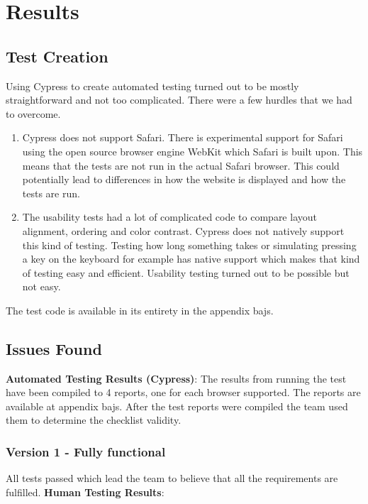 \documentclass[journal,twocolumn]{IEEEtran}
\begin{document}
\section{Results}
\subsection{Test Creation}
Using Cypress to create automated testing turned out to be mostly straightforward and not too complicated. There were a few hurdles that we had to overcome.

\begin{enumerate}
    \item Cypress does not support Safari. There is experimental support for Safari using the open source browser engine WebKit which Safari is built upon. This means that the tests are not run in the actual Safari browser. This could potentially lead to differences in how the website is displayed and how the tests are run.
    \item The usability tests had a lot of complicated code to compare layout alignment, ordering and color contrast. Cypress does not natively support this kind of testing. Testing how long something takes or simulating pressing a key on the keyboard for example has native support which makes that kind of testing easy and efficient. Usability testing turned out to be possible but not easy.
\end{enumerate}

The test code is available in its entirety in the appendix bajs. %

\subsection{Issues Found}
\textbf{Automated Testing Results (Cypress)}:
The results from running the test have been compiled to 4 reports, one for each browser supported. The reports are available at appendix bajs. %
After the test reports were compiled the team used them to determine the checklist validity.
\subsubsection{Version 1 - Fully functional}
All tests passed which lead the team to believe that all the requirements are fulfilled.
\textbf{Human Testing Results}:
\end{document}
